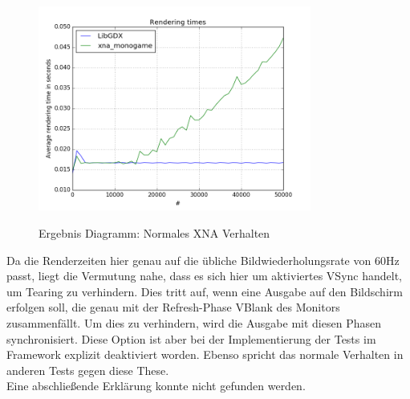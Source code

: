 \begin{figure}
\caption{Ergebnis Diagramm: Normales XNA Verhalten}
\centering
\includegraphics[width=0.8\textwidth]{xna_normal}
\label{dia:xna_normal}
\end{figure}
Da die Renderzeiten hier genau auf die übliche Bildwiederholungsrate von 60Hz passt, liegt die Vermutung nahe, dass es sich hier um aktiviertes VSync handelt, um Tearing zu verhindern. Dies tritt auf, wenn eine Ausgabe auf den Bildschirm erfolgen soll, die genau mit der Refresh-Phase VBlank des Monitors zusammenfällt. Um dies zu verhindern, wird die Ausgabe mit diesen Phasen synchronisiert. Diese Option ist aber bei der Implementierung der Tests im Framework explizit deaktiviert worden. Ebenso spricht das normale Verhalten in anderen Tests gegen diese These. \\
Eine abschließende Erklärung konnte nicht gefunden werden. 

